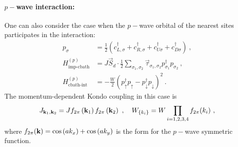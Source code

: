 \documentclass[reprint,hidelinks]{revtex4-2}
\begin{document}
\paragraph{\(p-\)wave interaction:} One can also consider the case when the \(p-\)wave orbital of the nearest sites participates in the interaction:
\begin{equation}\begin{aligned}
	p_{\sigma} &= \frac{1}{2}\left(c^\dagger_{L,\sigma} + c^\dagger_{R,\sigma} + c^\dagger_{U\sigma} + c^\dagger_{D\sigma}\right)~,\\
	H^{(p)}_\text{imp-cbath} &= J\vec{S}_d\cdot\frac{1}{2}\sum_{\sigma_1,\sigma_2}\vec{\tau}_{\sigma_1,\sigma_2} p^\dagger_{\sigma_1}p_{\sigma_2}~,\\
	H^{(p)}_\text{cbath-int} &= -\frac{W}{2}\left(p^\dagger_{\uparrow}p_{\uparrow} - p^\dagger_{\downarrow}p_{\downarrow}\right)^2~.
\end{aligned}\end{equation}
The momentum-dependent Kondo coupling in this case is 
\begin{equation}\begin{aligned}\label{p-wave k-space}
	J_{{\bf k}_1, {\bf k}_2} = J f_{{2\pi}}\left({\bf k}_1\right) f_{{2\pi}}\left({\bf k}_2\right) ~, \quad W_{\left\{ k_i \right\} } = W\prod_{i=1,2,3,4}f_{{2\pi}}(k_i)~,
\end{aligned}\end{equation}
where \(f_{2\pi}({\bf k}) = \cos\left( ak_x \right) + \cos\left( ak_y \right)\) is the form for the \(p-\)wave symmetric function.
\end{document}
